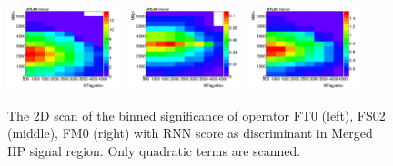 \begin{figure}[ht]
    \centering
    	\includegraphics[width=0.30\textwidth]{figures/aQGC/HPSRFT0RNN.pdf}
    	\includegraphics[width=0.30\textwidth]{figures/aQGC/HPSRFS02RNN.pdf}
    	\includegraphics[width=0.30\textwidth]{figures/aQGC/HPSRFM0RNN.pdf}
        \caption{The 2D scan of the binned significance of operator FT0 (left), FS02 (middle), FM0 (right) with RNN score as discriminant in Merged HP signal region. Only quadratic terms are scanned.}
        \label{fig:2lepaQGCBinnedSigRNN}
\end{figure}

\clearpage

